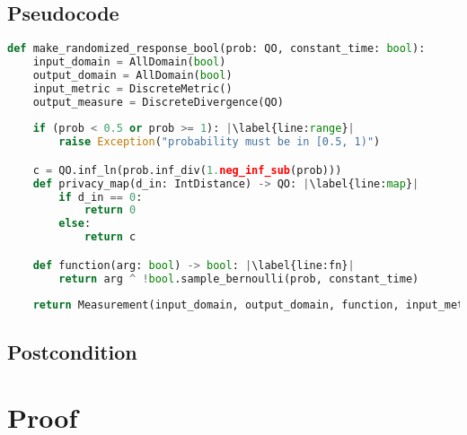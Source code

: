 \documentclass{article}
\begin{document}
\subsection*{Pseudocode}
\begin{lstlisting}[language=Python, escapechar=|]
def make_randomized_response_bool(prob: QO, constant_time: bool):
    input_domain = AllDomain(bool)
    output_domain = AllDomain(bool)
    input_metric = DiscreteMetric()
    output_measure = DiscreteDivergence(QO)
    
    if (prob < 0.5 or prob >= 1): |\label{line:range}|
        raise Exception("probability must be in [0.5, 1)")

    c = QO.inf_ln(prob.inf_div(1.neg_inf_sub(prob)))
    def privacy_map(d_in: IntDistance) -> QO: |\label{line:map}|
        if d_in == 0:
            return 0
        else: 
            return c

    def function(arg: bool) -> bool: |\label{line:fn}|
        return arg ^ !bool.sample_bernoulli(prob, constant_time)
    
    return Measurement(input_domain, output_domain, function, input_metric, output_measure, privacy_map)
\end{lstlisting}


\subsection*{Postcondition}


\section{Proof}
\end{document}
